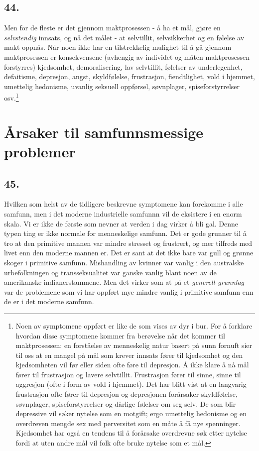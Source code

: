 \documentclass[oneside]{book}
\begin{document}
\section*{44.}
Men for de fleste er det gjennom maktprosessen - å ha et mål, gjøre en {\em
selvstendig} innsats, og nå det målet - at selvtillit, selvsikkerhet og en
følelse av makt oppnås. Når noen ikke har en tilstrekkelig mulighet til å gå
gjennom maktprosessen er konsekvensene (avhengig av individet og måten
maktprosessen forstyrres) kjedsomhet, demoralisering, lav selvtillit, følelser
av underlegenhet, defaitisme, depresjon, angst, skyldfølelse, frustrasjon,
fiendtlighet, vold i hjemmet, umettelig hedonisme, uvanlig seksuell oppførsel,
søvnplager, spiseforstyrrelser osv.\footnote{Noen av symptomene oppført er
like de som vises av dyr i bur. For å forklare hvordan disse symptomene kommer
fra berøvelse når det kommer til maktprosessen: en forståelse av menneskelig
natur basert på sunn fornuft sier til oss at en mangel på mål som krever
innsats fører til kjedsomhet og den kjedsomheten vil før eller siden ofte føre
til depresjon. Å ikke klare å nå mål fører til frustrasjon og lavere
selvtillit. Frustrasjon fører til sinne, sinne til aggresjon (ofte i form av
vold i hjemmet). Det har blitt vist at en langvarig frustrasjon ofte fører til
depresjon og depresjonen forårsaker skyldfølelse, søvnplager,
spiseforstyrrelser og dårlige følelser om seg selv. De som blir depressive vil
søker nytelse som en motgift; ergo umettelig hedonisme og en overdreven mengde
sex med perversitet som en måte å få nye spenninger. Kjedsomhet har også en
tendens til å forårsake overdrevne søk etter nytelse fordi at uten andre mål
vil folk ofte bruke nytelse som et mål.}

\chapter{Årsaker til samfunnsmessige problemer}
\section*{45.}
Hvilken som helst av de tidligere beskrevne symptomene kan forekomme i alle
samfunn, men i det moderne industrielle samfunnn vil de eksistere i en enorm
skala. Vi er ikke de første som nevner at verden i dag virker å bli gal. Denne
typen ting er ikke normale for menneskelige samfunn. Det er gode grunner til å
tro at den primitive mannen var mindre stresset og frustrert, og mer tilfreds
med livet enn den moderne mannen er. Det er sant at det ikke bare var gull og
grønne skoger i primitive samfunn. Mishandling av kvinner var vanlig i den
australske urbefolkningen og transseksualitet var ganske vanlig blant noen av
de amerikanske indianerstammene. Men det virker som at på et {\em generelt
grunnlag} var de problemene som vi har oppført mye mindre vanlig i primitive
samfunn enn de er i det moderne samfunn.
\end{document}
